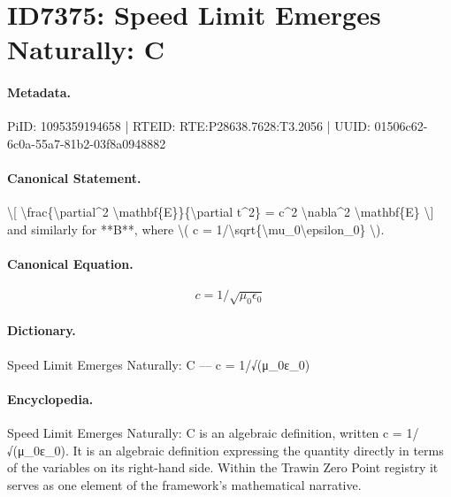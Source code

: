 \section*{ID7375: Speed Limit Emerges Naturally: C}
\paragraph{Metadata.}
PiID: 1095359194658 | RTEID: RTE:P28638.7628:T3.2056 | UUID: 01506c62-6c0a-55a7-81b2-03f8a0948882

\paragraph{Canonical Statement.}
\textbackslash{}[ \textbackslash{}frac\{\textbackslash{}partial\textasciicircum{}2 \textbackslash{}mathbf\{E\}\}\{\textbackslash{}partial t\textasciicircum{}2\} = c\textasciicircum{}2 \textbackslash{}nabla\textasciicircum{}2 \textbackslash{}mathbf\{E\} \textbackslash{}] and similarly for **B**, where \textbackslash{}( c = 1/\textbackslash{}sqrt\{\textbackslash{}mu\_0\textbackslash{}epsilon\_0\} \textbackslash{}).

\paragraph{Canonical Equation.}
\[
c = 1/\sqrt{\mu_0\epsilon_0}
\]

\paragraph{Dictionary.}
Speed Limit Emerges Naturally: C — c = 1/√(μ\_0ε\_0)

\paragraph{Encyclopedia.}
Speed Limit Emerges Naturally: C is an algebraic definition, written c = 1/√(μ\_0ε\_0). It is an algebraic definition expressing the quantity directly in terms of the variables on its right-hand side. Within the Trawin Zero Point registry it serves as one element of the framework's mathematical narrative.
